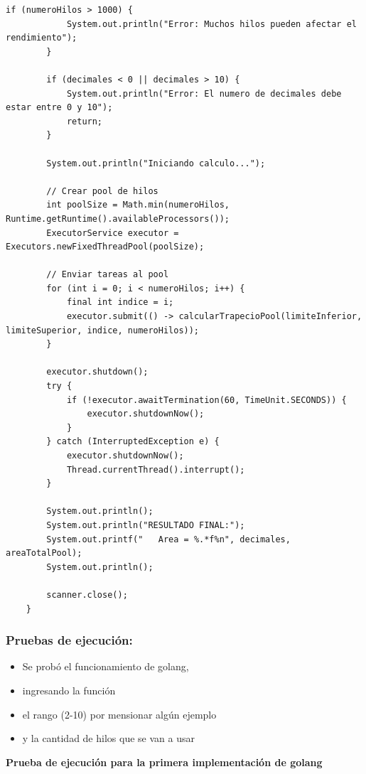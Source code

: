\begin{lstlisting}[style=cpp-style, caption={Función Main en TrapecioPool.java }]
        if (numeroHilos > 1000) {
            System.out.println("Error: Muchos hilos pueden afectar el rendimiento");
        }

        if (decimales < 0 || decimales > 10) {
            System.out.println("Error: El numero de decimales debe estar entre 0 y 10");
            return;
        }

        System.out.println("Iniciando calculo...");

        // Crear pool de hilos
        int poolSize = Math.min(numeroHilos, Runtime.getRuntime().availableProcessors());
        ExecutorService executor = Executors.newFixedThreadPool(poolSize);

        // Enviar tareas al pool
        for (int i = 0; i < numeroHilos; i++) {
            final int indice = i;
            executor.submit(() -> calcularTrapecioPool(limiteInferior, limiteSuperior, indice, numeroHilos));
        }

        executor.shutdown();
        try {
            if (!executor.awaitTermination(60, TimeUnit.SECONDS)) {
                executor.shutdownNow();
            }
        } catch (InterruptedException e) {
            executor.shutdownNow();
            Thread.currentThread().interrupt();
        }

        System.out.println();
        System.out.println("RESULTADO FINAL:");
        System.out.printf("   Area = %.*f%n", decimales, areaTotalPool);
        System.out.println();

        scanner.close();
    }
\end{lstlisting}


\subsubsection{Pruebas de ejecución:}


\begin{itemize}
    \item Se probó el funcionamiento de golang,
    \item ingresando la función 
    \item el rango (2-10) por mensionar algún ejemplo
    \item y la cantidad de hilos que se van a usar
\end{itemize}

\textbf{Prueba de ejecución para la primera implementación de golang}

